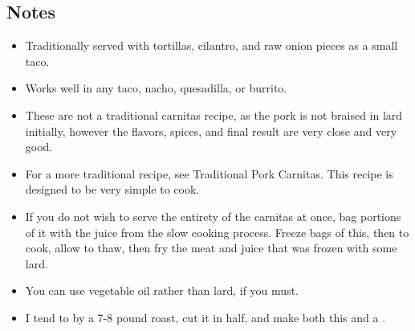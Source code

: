 \begin{multicols}{2}
\subsection*{Notes}
\begin{itemize}
    \item Traditionally served with tortillas, cilantro, and raw onion pieces as a small taco.
    \item Works well in any taco, nacho, quesadilla, or burrito.
    \item These are not a traditional carnitas recipe, as the pork is not braised in lard initially, however the flavors, spices, and final result are very close and very good.
    \item For a more traditional recipe, see Traditional Pork Carnitas. This recipe is designed to be very simple to cook.
    \item If you do not wish to serve the entirety of the carnitas at once, bag portions of it with the juice from the slow cooking process. Freeze bags of this, then to cook, allow to thaw, then fry the meat and juice that was frozen with some lard.
    \item You can use vegetable oil rather than lard, if you must.
    \item I tend to by a 7-8 pound roast, cut it in half, and make both this and a .

\end{itemize}
\end{multicols}
\clearpage